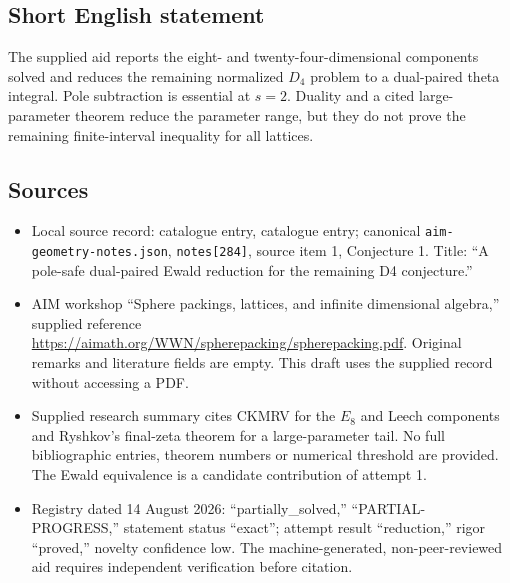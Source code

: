 \documentclass[11pt]{article}
\begin{document}
\subsection{Short English statement}
The supplied aid reports the eight- and twenty-four-dimensional components solved and reduces the remaining normalized \(D_4\) problem to a dual-paired theta integral. Pole subtraction is essential at \(s=2\). Duality and a cited large-parameter theorem reduce the parameter range, but they do not prove the remaining finite-interval inequality for all lattices.
\subsection{Sources}
\begin{itemize}
\item Local source record: catalogue entry, catalogue entry; canonical \texttt{aim-geometry-notes.json}, \texttt{notes[284]}, source item 1, Conjecture 1. Title: ``A pole-safe dual-paired Ewald reduction for the remaining D4 conjecture.''
\item AIM workshop ``Sphere packings, lattices, and infinite dimensional algebra,'' supplied reference \url{https://aimath.org/WWN/spherepacking/spherepacking.pdf}. Original remarks and literature fields are empty. This draft uses the supplied record without accessing a PDF.
\item Supplied research summary cites CKMRV for the \(E_8\) and Leech components and Ryshkov's final-zeta theorem for a large-parameter tail. No full bibliographic entries, theorem numbers or numerical threshold are provided. The Ewald equivalence is a candidate contribution of attempt 1.
\item Registry dated 14 August 2026: ``partially\_solved,'' ``PARTIAL-PROGRESS,'' statement status ``exact''; attempt result ``reduction,'' rigor ``proved,'' novelty confidence low. The machine-generated, non-peer-reviewed aid requires independent verification before citation.
\end{itemize}
\end{document}
